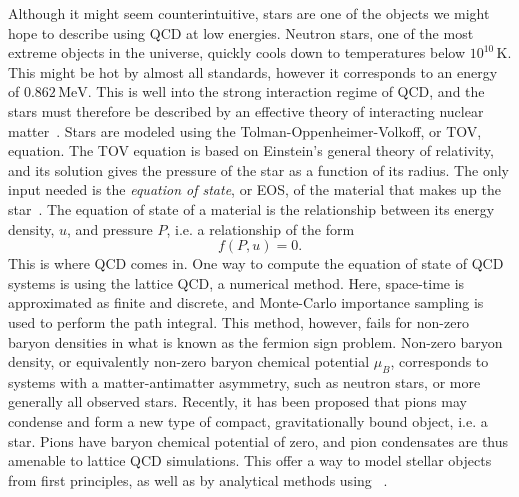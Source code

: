Although it might seem counterintuitive, stars are one of the objects we might hope to describe using QCD at low energies.
Neutron stars, one of the most extreme objects in the universe, quickly cools down to temperatures below $10^{10} \, \text{K}$.
This might be hot by almost all standards, however it corresponds to an energy of $0.862 \, \text{MeV}$.
This is well into the strong interaction regime of QCD, and the stars must therefore be described by an effective theory of interacting nuclear matter~\cite{glendenning:compcat_stars,from_hadrons_to_quarks}.
Stars are modeled using the Tolman-Oppenheimer-Volkoff, or TOV, equation.
The TOV equation is based on Einstein's general theory of relativity, and its solution gives the pressure of the star as a function of its radius.
The only input needed is the \emph{equation of state}, or EOS, of the material that makes up the star~\cite{Carroll:spacetime}.
The equation of state of a material is the relationship between its energy density, $u$, and pressure $P$, i.e. a relationship of the form
\begin{equation}
    f(P, u) = 0.
\end{equation}
This is where QCD comes in.
One way to compute the equation of state of QCD systems is using the lattice QCD, a numerical method.
Here, space-time is approximated as finite and discrete, and Monte-Carlo importance sampling is used to perform the path integral.
This method, however, fails for non-zero baryon densities in what is known as the fermion sign problem.
Non-zero baryon density, or equivalently non-zero baryon chemical potential $\mu_B$, corresponds to systems with a matter-antimatter asymmetry, such as neutron stars, or more generally all observed stars.
Recently, it has been proposed that pions may condense and form a new type of compact, gravitationally bound object, i.e. a star.
Pions have baryon chemical potential of zero, and pion condensates are thus amenable to lattice QCD simulations.
This offer a way to model stellar objects from first principles, as well as by analytical methods using \chpt~\cite{new_clas_of_compact_stars,andersen:bose_einstein}.

